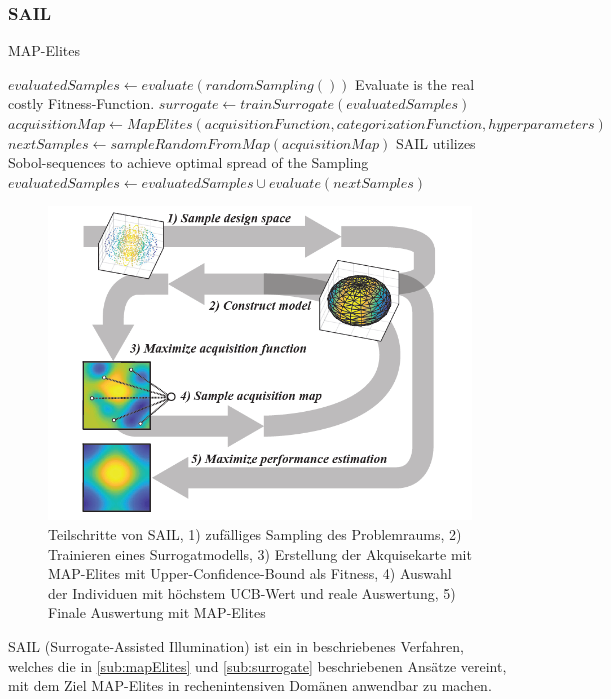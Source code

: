 \subsubsection{SAIL}

\begin{algorithm}
	\caption{MAP-Elites} \label{alg:mapElites}
	\begin{algorithmic}[1]
\State $evaluatedSamples \gets evaluate(randomSampling())$ \Comment Evaluate is the real costly Fitness-Function.
\Else
\State $surrogate \gets trainSurrogate(evaluatedSamples)$
\State $acquisitionMap \gets MapElites(acquisitionFunction,categorizationFunction,hyperparameters)$
\State $nextSamples \gets sampleRandomFromMap(acquisitionMap)$ \Comment SAIL utilizes Sobol-sequences to achieve optimal spread of the Sampling
\State $evaluatedSamples \gets evaluatedSamples \cup evaluate(nextSamples)$
\EndIf
			\EndWhile
		\EndProcedure
	\end{algorithmic}
\end{algorithm}

\begin{figure}[h]
	\centering
	\includegraphics[width=.7\linewidth]{bilder/sail}
	\caption[Teilschritte von SAIL]{Teilschritte von SAIL, 
		1) zufälliges Sampling des Problemraums, 
		2) Trainieren eines Surrogatmodells, 
		3) Erstellung der Akquisekarte mit MAP-Elites mit Upper-Confidence-Bound als Fitness, 
		4) Auswahl der Individuen mit höchstem UCB-Wert und reale Auswertung,
		5) Finale Auswertung mit MAP-Elites
	}
	\label{fig:sail}
\end{figure}

SAIL (Surrogate-Assisted Illumination) ist ein in \cite{Gaier.6152018} beschriebenes Verfahren, welches die in \cref{sub:mapElites} und \cref{sub:surrogate} beschriebenen Ansätze vereint, mit dem Ziel MAP-Elites in rechenintensiven Domänen anwendbar zu machen.

